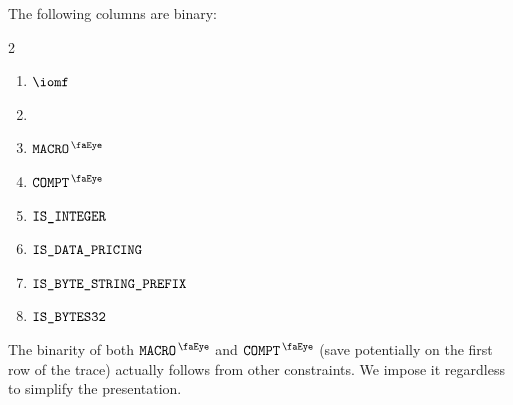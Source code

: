 The following columns are binary:
\begin{multicols}{2}
	\begin{enumerate}
		\item $\iomf$
		\item[\vspace{\fill}]
		\item $\isRlpUtilsMacro$
		\item $\isRlpUtilsCompt$
		\item $\texttt{IS\_INTEGER}$
		\item $\texttt{IS\_DATA\_PRICING}$
		\item $\texttt{IS\_BYTE\_STRING\_PREFIX}$
		\item $\texttt{IS\_BYTES32}$
	\end{enumerate}
\end{multicols}
\saNote{}
The binarity of both
$\isRlpUtilsMacro$ and
$\isRlpUtilsCompt$
(save potentially on the first row of the trace)
actually follows from other constraints.
We impose it regardless to simplify the presentation.
